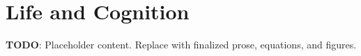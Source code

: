 
\section{Life and Cognition}
\label{sec:life-and-cognition}

\textbf{TODO}: Placeholder content. Replace with finalized prose, equations, and figures.

